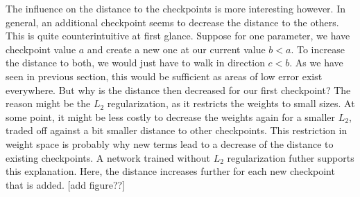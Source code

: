 The influence on the distance to the checkpoints is more interesting however. In
general, an additional checkpoint seems to decrease the distance to the others.
This is quite counterintuitive at first glance. Suppose for one parameter, we
have checkpoint value $a$ and create a new one at our current value $b<a$. To
increase the distance to both, we would just have to walk in direction $c<b$. As
we have seen in previous section, this would be sufficient as areas of low error
exist everywhere. But why is the distance then decreased for our first
checkpoint? The reason might be the $L_2$ regularization, as it restricts the
weights to small sizes. At some point, it might be less costly to decrease the
weights again for a smaller $L_2$, traded off against a bit smaller distance to
other checkpoints. This restriction in weight space is probably why new terms
lead to a decrease of the distance to existing checkpoints. A network trained
without $L_2$ regularization futher supports this explanation. Here, the
distance increases further for each new checkpoint that is added. [add figure??]

